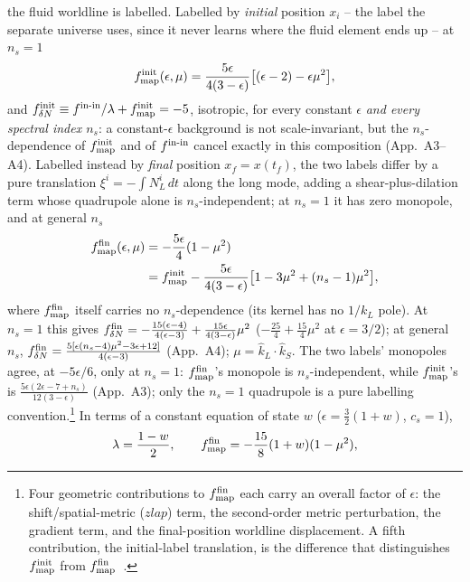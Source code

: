 \documentclass[aps,prd,twocolumn,superscriptaddress,showpacs,preprintnumbers,nofootinbib,longbibliography,floatfix]{revtex4-2}
\newcommand{\eps}{\epsilon}
\begin{document}
the fluid worldline is labelled. Labelled by \emph{initial} position $x_i$ -- the label the
separate universe uses, since it never learns where the fluid element ends up -- at $n_s=1$
\begin{equation}
f_{\rm map}^{\rm init}(\eps,\mu)=\frac{5\eps}{4(3-\eps)}\big[(\eps-2)-\eps\mu^2\big],
\label{eq:fmap}
\end{equation}
and $f_{\delta N}^{\rm init}\equiv f^{\rm in\text{-}in}/\lambda+f_{\rm map}^{\rm init}=-5$,
isotropic, for every constant $\eps$ \emph{and every spectral index $n_s$}: a constant-$\eps$
background is not scale-invariant, but the $n_s$-dependence of $f_{\rm map}^{\rm init}$ and of
$f^{\rm in\text{-}in}$ cancel exactly in this composition (App.~A3--A4). Labelled instead by
\emph{final} position $x_f=x(t_f)$, the two labels differ by a pure translation
$\xi^i=-\int N_L^i\,dt$ along the long mode, adding a shear-plus-dilation term whose quadrupole
alone is $n_s$-independent; at $n_s=1$ it has zero monopole, and at general $n_s$
\begin{align}
f_{\rm map}^{\rm fin}(\eps,\mu)&=-\frac{5\eps}{4}(1-\mu^2)\nonumber\\
&=f_{\rm map}^{\rm init}-
\frac{5\eps}{4(3-\eps)}\big[1-3\mu^2+(n_s-1)\mu^2\big],
\label{eq:fmapfin}
\end{align}
where $f_{\rm map}^{\rm fin}$ itself carries no $n_s$-dependence (its kernel has no $1/k_L$
pole). At $n_s=1$ this gives
$f_{\delta N}^{\rm fin}=-\tfrac{15(\eps-4)}{4(\eps-3)}+\tfrac{15\eps}{4(3-\eps)}\mu^2$
($-\tfrac{25}{4}+\tfrac{15}{4}\mu^2$ at $\eps=3/2$); at general $n_s$,
$f_{\delta N}^{\rm fin}=\tfrac{5[\eps(n_s-4)\mu^2-3\eps+12]}{4(\eps-3)}$ (App.~A4);
$\mu=\hat k_L\!\cdot\!\hat k_S$. The two labels' monopoles agree, at $-5\eps/6$, only at
$n_s=1$: $f_{\rm map}^{\rm fin}$'s monopole is $n_s$-independent, while $f_{\rm map}^{\rm init}$'s
is $\frac{5\eps(2\eps-7+n_s)}{12(3-\eps)}$ (App.~A3); only the $n_s=1$ quadrupole is a pure
labelling convention.\footnote{Four geometric contributions to $f_{\rm map}^{\rm fin}$ each
carry an overall factor of $\eps$: the shift/spatial-metric ($zlap$) term, the second-order
metric perturbation, the gradient term, and the final-position worldline displacement. A
fifth contribution, the initial-label translation, is the difference that distinguishes
$f_{\rm map}^{\rm init}$ from $f_{\rm map}^{\rm fin}$~\cite{Golden2026Threading}.} In terms of a constant equation of
state $w$ ($\eps=\tfrac32(1+w)$, $c_s=1$),
\begin{equation}
\lambda=\frac{1-w}{2},\qquad
f_{\rm map}^{\rm fin}=-\frac{15}{8}(1+w)(1-\mu^2),
\label{eq:generalw}
\end{equation}
\end{document}
